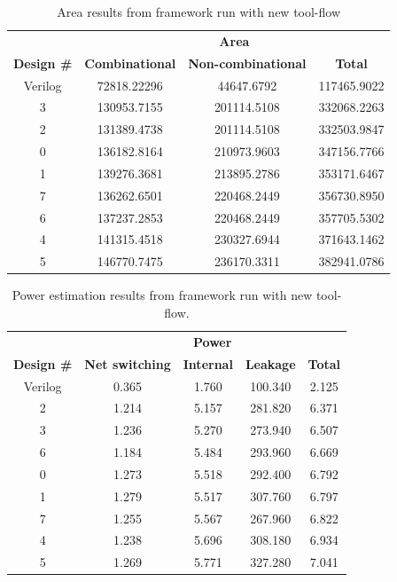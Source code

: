 \begin{table}[hbtp]
    \centering
    \begin{tabular}{cccc}
    & \multicolumn{3}{c}{\textbf{Area}} \\
    \cline{2-4}
    \textbf{Design \#} & \textbf{Combinational} & \textbf{Non-combinational} & \textbf{Total} \\
    \toprule
    Verilog & 72818.22296 & 44647.6792 & 117465.9022 \\
    3 & 130953.7155 & 201114.5108 & 332068.2263 \\
    2 & 131389.4738 & 201114.5108 & 332503.9847 \\
    0 & 136182.8164 & 210973.9603 & 347156.7766 \\
    1 & 139276.3681 & 213895.2786 & 353171.6467 \\
    7 & 136262.6501 & 220468.2449 & 356730.8950 \\
    6 & 137237.2853 & 220468.2449 & 357705.5302 \\
    4 & 141315.4518 & 230327.6944 & 371643.1462 \\
    5 & 146770.7475 & 236170.3311 & 382941.0786 \\
    \bottomrule
    \end{tabular}
    \caption{Area results from framework run with new tool-flow}
    \label{tab:resultgraphareaframeworkrun2}
\end{table}

\begin{table}[hbtp]
    \centering
    \begin{tabular}{ccccc}
    & \multicolumn{4}{c}{\textbf{Power}} \\
    \cline{2-5}
    \textbf{Design \#} & \textbf{Net switching} & \textbf{Internal} & \textbf{Leakage} & \textbf{Total} \\
    \toprule
    Verilog & 0.365 & 1.760 & 100.340 & 2.125 \\
    2 & 1.214 & 5.157 & 281.820 & 6.371 \\
    3 & 1.236 & 5.270 & 273.940 & 6.507 \\
    6 & 1.184 & 5.484 & 293.960 & 6.669 \\
    0 & 1.273 & 5.518 & 292.400 & 6.792 \\
    1 & 1.279 & 5.517 & 307.760 & 6.797 \\
    7 & 1.255 & 5.567 & 267.960 & 6.822 \\
    4 & 1.238 & 5.696 & 308.180 & 6.934 \\
    5 & 1.269 & 5.771 & 327.280 & 7.041 \\
    \bottomrule
    \end{tabular}
    \caption{Power estimation results from framework run with new tool-flow.}
    \label{tab:resultgraphpowerframeworkrun2}
\end{table}

